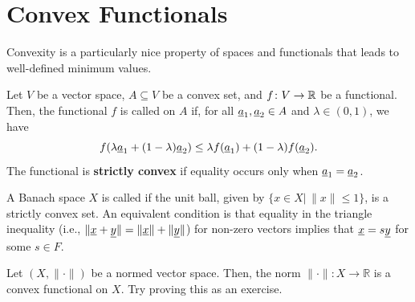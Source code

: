 \section{Convex Functionals}

Convexity is a particularly nice property of spaces and functionals that leads to well-defined minimum values.




\begin{definition}
Let $V$ be a vector space, $A \subseteq V$ be a convex set, and $f \colon V \rightarrow \mathbb{R}$ be a functional.
Then, the functional $f$ is called  on $A$ if, for all $\underline{a}_1,\underline{a}_2 \in A$ and $\lambda\in(0,1)$, we have
\[ f( \lambda \underline{a}_1 + (1-\lambda) \underline{a}_2 ) \leq \lambda f( \underline{a}_1 ) + (1-\lambda) f ( \underline{a}_2 ). \]
The functional is \textbf{strictly convex} if equality occurs only when $\underline{a}_1 = \underline{a}_2$.
\end{definition}

\begin{definition}
A Banach space $X$ is called  if the unit ball,  given by $\{ x\in X | \, \| x \| \leq 1 \}$, is a strictly convex set.
An equivalent condition is that equality in the triangle inequality (i.e., $\| \underline{x} + \underline{y} \| = \| \underline{x} \| + \| \underline{y} \|$) for non-zero vectors implies that $ \underline{x} = s \underline{y} $ for some $s\in F$.
\end{definition}

\begin{example}
Let $(X,\|\cdot\|)$ be a normed vector space.
Then, the norm $\| \cdot \| \colon X \rightarrow \mathbb{R}$ is a convex functional on $X$.
Try proving this as an exercise.
\end{example}

